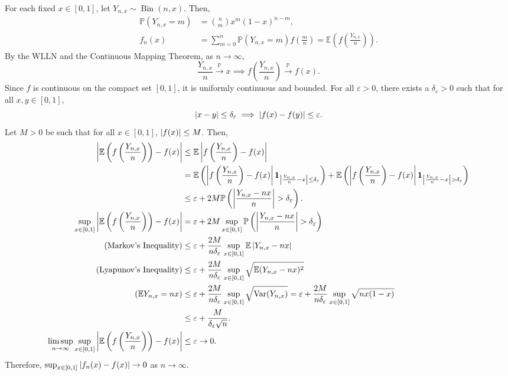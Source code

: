 \documentclass{huhtakm-template-book-v2}
\newcommand{\prob}{\mathbb{P}}
\newcommand{\expect}{\mathbb{E}}
\DeclareMathOperator{\Bin}{Bin}
\DeclareMathOperator{\Var}{Var}
\begin{document}
    \begin{proofing}
        For each fixed $x \in [0,1]$, let $Y_{n,x} \sim \Bin(n,x)$. Then,
        \begin{align*}
            \prob(Y_{n,x} = m) &= \binom{n}{m}x^{m}(1-x)^{n-m},\\
            f_{n}(x) &= \sum_{m = 0}^{n}\prob(Y_{n,x} = m)f\left(\frac{m}{n}\right) = \expect\left(f\left(\frac{Y_{n,x}}{n}\right)\right).
        \end{align*}
        By the WLLN and the Continuous Mapping Theorem, as $n \to \infty$,
        \begin{equation*}
            \frac{Y_{n,x}}{n} \xrightarrow{\prob} x \implies f\left(\frac{Y_{n,x}}{n}\right) \xrightarrow{\prob} f(x).
        \end{equation*}
        Since $f$ is continuous on the compact set $[0,1]$, it is uniformly continuous and bounded. For all $\varepsilon > 0$, there exists a $\delta_{\varepsilon} > 0$ such that for all $x,y \in [0,1]$,
        \begin{equation*}
            \left|{x-y}\right| \leq \delta_{\varepsilon} \implies \left|{f(x)-f(y)}\right| \leq \varepsilon.
        \end{equation*}
        Let $M > 0$ be such that for all $x \in [0,1]$, $\left|{f(x)}\right| \leq M$. Then,
        \begin{align*}
            \abs{\expect\left(f\left(\frac{Y_{n,x}}{n}\right)\right)-f(x)} &\leq \expect\abs{f\left(\frac{Y_{n,x}}{n}\right)-f(x)}\\
            &= \expect\left(\abs{f\left(\frac{Y_{n,x}}{n}\right)-f(x)}\mathbf{1}_{\abs{\frac{Y_{n,x}}{n}-x} \leq \delta_{\varepsilon}}\right)+\expect\left(\abs{f\left(\frac{Y_{n,x}}{n}\right)-f(x)}\mathbf{1}_{\abs{\frac{Y_{n,x}}{n}-x} > \delta_{\varepsilon}}\right)\\
            &\leq \varepsilon+2M\prob\left(\abs{\frac{Y_{n,x}-nx}{n}} > {\delta_{\varepsilon}}\right).\\
            \sup_{x \in [0,1]}\abs{\expect\left(f\left(\frac{Y_{n,x}}{n}\right)\right)-f(x)} &= \varepsilon+2M\sup_{x \in [0,1]}\prob\left(\abs{\frac{Y_{n,x}-nx}{n}} > {\delta_{\varepsilon}}\right)\\
            \tag{Markov's Inequality}
            &\leq \varepsilon+\frac{2M}{n\delta_{\varepsilon}}\sup_{x \in [0,1]}\expect\abs{Y_{n,x}-nx}\\
            \tag{Lyapunov's Inequality}
            &\leq \varepsilon+\frac{2M}{n\delta_{\varepsilon}}\sup_{x \in [0,1]}\sqrt{\expect(Y_{n,x}-nx)^{2}}\\
            \tag{$\expect{Y_{n,x}} = nx$}
            &\leq \varepsilon+\frac{2M}{n\delta_{\varepsilon}}\sup_{x \in [0,1]}\sqrt{\Var(Y_{n,x})} = \varepsilon+\frac{2M}{n\delta_{\varepsilon}}\sup_{x \in [0,1]}\sqrt{nx(1-x)}\\
            &\leq \varepsilon+\frac{M}{\delta_{\varepsilon}\sqrt{n}}.\\
            \limsup_{n \to \infty}\sup_{x \in [0,1]}\abs{\expect\left(f\left(\frac{Y_{n,x}}{n}\right)\right)-f(x)} &\leq \varepsilon \to 0.
        \end{align*}
        Therefore, $\sup_{x \in [0,1]}\left|{f_{n}(x)-f(x)}\right| \to 0$ as $n \to \infty$.
    \end{proofing}
\end{document}
